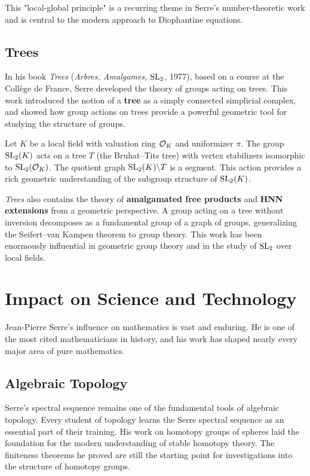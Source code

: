 This "local-global principle" is a recurring theme in Serre's number-theoretic work and is central to the modern approach to Diophantine equations.

\subsection{Trees}

In his book \textit{Trees} (\textit{Arbres, Amalgames, \(\operatorname{SL}_2\)}, 1977), based on a course at the Coll\`ege de France, Serre developed the theory of groups acting on trees. This work introduced the notion of a \textbf{tree} as a simply connected simplicial complex, and showed how group actions on trees provide a powerful geometric tool for studying the structure of groups.

\begin{theorem}
Let \(K\) be a local field with valuation ring \(\mathcal{O}_K\) and uniformizer \(\pi\). The group \(\operatorname{SL}_2(K)\) acts on a tree \(T\) (the Bruhat--Tits tree) with vertex stabilizers isomorphic to \(\operatorname{SL}_2(\mathcal{O}_K)\). The quotient graph \(\operatorname{SL}_2(K) \backslash T\) is a segment. This action provides a rich geometric understanding of the subgroup structure of \(\operatorname{SL}_2(K)\).
\end{theorem}

\textit{Trees} also contains the theory of \textbf{amalgamated free products} and \textbf{HNN extensions} from a geometric perspective. A group acting on a tree without inversion decomposes as a fundamental group of a graph of groups, generalizing the Seifert--van Kampen theorem to group theory. This work has been enormously influential in geometric group theory and in the study of \(\operatorname{SL}_2\) over local fields.

\section{Impact on Science and Technology}

Jean-Pierre Serre's influence on mathematics is vast and enduring. He is one of the most cited mathematicians in history, and his work has shaped nearly every major area of pure mathematics.

\subsection{Algebraic Topology}

Serre's spectral sequence remains one of the fundamental tools of algebraic topology. Every student of topology learns the Serre spectral sequence as an essential part of their training. His work on homotopy groups of spheres laid the foundation for the modern understanding of stable homotopy theory. The finiteness theorems he proved are still the starting point for investigations into the structure of homotopy groups.

